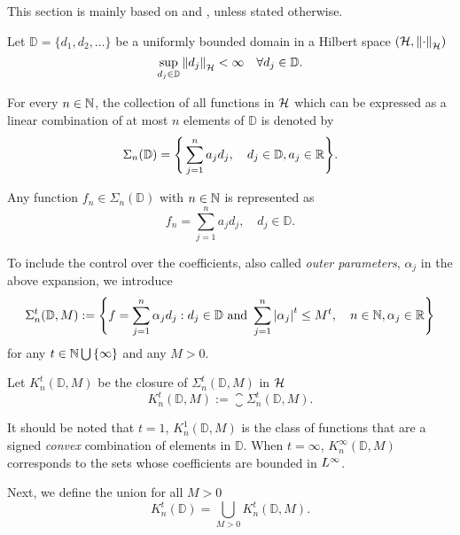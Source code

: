 This section is mainly based on \cite[Section 8]{devore_1998} and
\cite{vandervaartWeakConvergenceEmpirical1996}, unless stated otherwise.

Let $\mathbb{D} = \{d_1,d_2,\dots\}$ be a uniformly bounded domain in a Hilbert
space $(\mathcal{H}, \left\| \cdot \right\|_{\mathcal{H}})$
\begin{equation}
    \sup_{d_j\in \mathbb{D}} \left\| d_j \right\|_{\mathcal{H}} < \infty \quad 
    \forall d_j \in \mathbb{D}.
\end{equation}

For every $n \in \mathbb{N}$, the collection of all functions in $\mathcal{H}$
which can be expressed as a linear combination of at most $n$ elements of
$\mathbb{D}$ is denoted by
\begin{equation}
    \label{eq:dict_represent}
    \Sigma_n(\mathbb{D}) = \Bigg\{
        \sum_{j=1}^n a_j d_j, \quad
        d_j \in \mathbb{D}, a_j \in \mathbb{R}
    \Bigg\}.
\end{equation}

Any function $f_n \in \Sigma_n(\mathbb{D})$ with $n \in \mathbb{N}$ is represented as
\begin{equation}
    \label{eq:gm}
    f_n = \sum_{j=1}^n a_j d_j, \quad d_j \in \mathbb{D}.
\end{equation}

To include the control over the
coefficients, also called \textit{outer parameters}, $\alpha_j$ in the above
expansion, we introduce
\begin{equation}
    \label{eq:dict_sigma}
    \Sigma^{t}_n(\mathbb{D}, M) := \Bigg\{
        f = \sum_{j=1}^n \alpha_j d_j: 
        d_j \in \mathbb{D} \textnormal{ and } 
        \sum_{j=1}^n \left| \alpha_j \right|^t \leq M^t, \quad 
        n \in \mathbb{N}, \alpha_j \in \mathbb{R}
    \Bigg\}
\end{equation}
for any $t \in \mathbb{N} \bigcup\, \{\infty\}$ and any $M > 0$. 

Let $K^t_n(\mathbb{D}, M)$ be the closure of $\Sigma^t_n(\mathbb{D}, M)$ in
$\mathcal{H}$
\begin{equation}
    K^t_n(\mathbb{D}, M) := \closure{\Sigma^t_n(\mathbb{D}, M)}.
\end{equation}

It should be noted that $t = 1$, $K^1_n(\mathbb{D}, M)$ is the class of
functions that are a signed \textit{convex} combination of elements in
$\mathbb{D}$. When $t = \infty$, $K^{\infty}_n(\mathbb{D}, M)$ corresponds to
the sets whose coefficients are bounded in $L^{\infty}$. 

Next, we define the union for all $M > 0$
\begin{equation}
    K^t_n(\mathbb{D}) = \bigcup_{M > 0} K^t_n(\mathbb{D}, M).
\end{equation}

